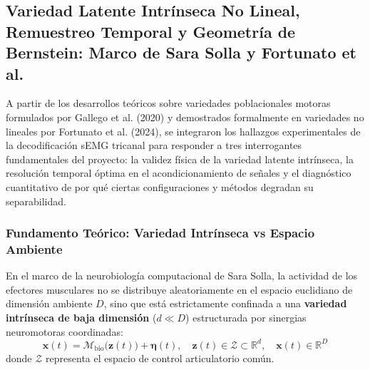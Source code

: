 \documentclass[11pt,a4paper,openany]{book}
\theoremstyle{definition}
\begin{document}
\subsection{Variedad Latente Intrínseca No Lineal, Remuestreo Temporal y Geometría de Bernstein: Marco de Sara Solla y Fortunato et al.}
\label{subsec:variedad_intrinseca_solla_resolucion}

A partir de los desarrollos teóricos sobre variedades poblacionales motoras formulados por Gallego et al. (2020) y demostrados formalmente en variedades no lineales por Fortunato et al. (2024), se integraron los hallazgos experimentales de la decodificación sEMG tricanal para responder a tres interrogantes fundamentales del proyecto: la validez física de la variedad latente intrínseca, la resolución temporal óptima en el acondicionamiento de señales y el diagnóstico cuantitativo de por qué ciertas configuraciones y métodos degradan su separabilidad.

\subsubsection{Fundamento Teórico: Variedad Intrínseca vs Espacio Ambiente}
\label{subsubsec:fundamento_variedad_solla}

En el marco de la neurobiología computacional de Sara Solla, la actividad de los efectores musculares no se distribuye aleatoriamente en el espacio euclidiano de dimensión ambiente $D$, sino que está estrictamente confinada a una \textbf{variedad intrínseca de baja dimensión} ($d \ll D$) estructurada por sinergias neuromotoras coordinadas:
\begin{equation}
    \mathbf{x}(t) = \mathcal{M}_{\text{bio}}\big(\mathbf{z}(t)\big) + \boldsymbol{\eta}(t), \quad \mathbf{z}(t) \in \mathcal{Z} \subset \mathbb{R}^d, \quad \mathbf{x}(t) \in \mathbb{R}^D
\end{equation}
donde $\mathcal{Z}$ representa el espacio de control articulatorio común.
\end{document}
